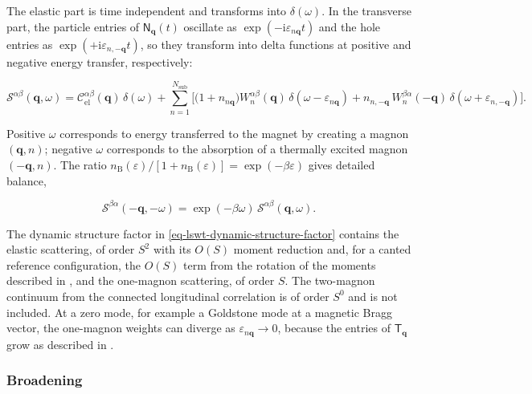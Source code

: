 The elastic part is time independent and transforms into \(\delta(\omega)\). In the transverse part, the particle entries of \(\mathsf N_{\mathbf q}(t)\) oscillate as \(\exp(-\mathrm i\varepsilon_{n\mathbf q}t)\) and the hole entries as \(\exp(+\mathrm i\varepsilon_{n,-\mathbf q}t)\), so they transform into delta functions at positive and negative energy transfer, respectively:

\begin{equation}\label{eq-lswt-dynamic-structure-factor}
\mathcal S^{\alpha\beta}(\mathbf q,\omega)
=\mathcal C_{\mathrm{el}}^{\alpha\beta}(\mathbf q)\,\delta(\omega)
+\sum_{n=1}^{N_{\mathrm{sub}}}\Big[\big(1+n_{n\mathbf q}\big)W_n^{\alpha\beta}(\mathbf q)\,\delta(\omega-\varepsilon_{n\mathbf q})
+n_{n,-\mathbf q}\,W_n^{\beta\alpha}(-\mathbf q)\,\delta(\omega+\varepsilon_{n,-\mathbf q})\Big].
\end{equation}

Positive \(\omega\) corresponds to energy transferred to the magnet by creating a magnon \((\mathbf q,n)\); negative \(\omega\) corresponds to the absorption of a thermally excited magnon \((-\mathbf q,n)\). The ratio \(n_{\mathrm B}(\varepsilon)/[1+n_{\mathrm B}(\varepsilon)]=\exp(-\beta\varepsilon)\) gives detailed balance,

\begin{equation}\label{eq-lswt-detailed-balance}
\mathcal S^{\beta\alpha}(-\mathbf q,-\omega)=\exp(-\beta\omega)\,\mathcal S^{\alpha\beta}(\mathbf q,\omega).
\end{equation}

The dynamic structure factor in \eqref{eq-lswt-dynamic-structure-factor} contains the elastic scattering, of order \(S^2\) with its \(O(S)\) moment reduction and, for a canted reference configuration, the \(O(S)\) term from the rotation of the moments described in , and the one-magnon scattering, of order \(S\). The two-magnon continuum from the connected longitudinal correlation is of order \(S^0\) and is not included. At a zero mode, for example a Goldstone mode at a magnetic Bragg vector, the one-magnon weights can diverge as \(\varepsilon_{n\mathbf q}\to0\), because the entries of \(\mathsf T_{\mathbf q}\) grow as described in .

\subsubsection{Broadening}

